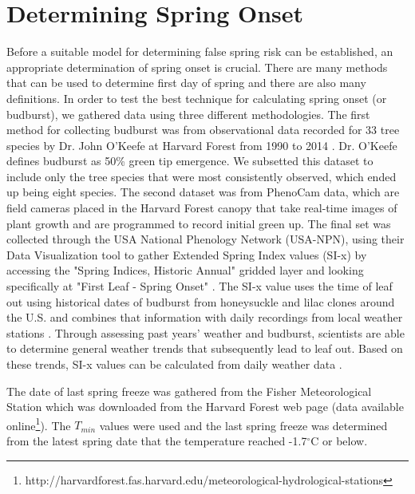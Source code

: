 \documentclass{article}\usepackage[]{graphicx}\usepackage[]{color}
\begin{document}
\section{Determining Spring Onset}
Before a suitable model for determining false spring risk can be established, an appropriate determination of spring onset is crucial. There are many methods that can be used to determine first day of spring and there are also many definitions. In order to test the best technique for calculating spring onset (or budburst), we gathered data using three different methodologies. The first method for collecting budburst was from observational data recorded for 33 tree species by Dr. John O'Keefe at Harvard Forest from 1990 to 2014 \citep{OKeefe2014}. 
Dr. O'Keefe defines budburst as 50\% green tip emergence. We subsetted this dataset to include only the tree species that were most consistently observed, which ended up being eight species.
The second dataset was from PhenoCam data, which are field cameras placed in the Harvard Forest canopy that take real-time images of plant growth and are programmed to record initial green up. The final set was collected through the USA National Phenology Network (USA-NPN), using their Data Visualization tool to gather Extended Spring Index values (SI-x) by accessing the "Spring Indices, Historic Annual" gridded layer and looking specifically at "First Leaf - Spring Onset" \citep{SI-x2016}. The SI-x value uses the time of leaf out using historical dates of budburst from honeysuckle and lilac clones around the U.S. and combines that information with daily recordings from local weather stations \citep{USA-NPN2016, Ault2015, Ault2015a, Schwartz2013, Schwartz1997}. 
Through assessing past years' weather and budburst, scientists are able to determine general weather trends that subsequently lead to leaf out. Based on these trends, SI-x values can be calculated from daily weather data \citep{USA-NPN2016}.
\par
The date of last spring freeze was gathered from the Fisher Meteorological Station which was downloaded from the Harvard Forest web page (data available online\footnote{http://harvardforest.fas.harvard.edu/meteorological-hydrological-stations}). The $T_{min}$ values were used and the last spring freeze was determined from the latest spring date that the temperature reached -1.7$^{\circ}$C or below. 
\par
\end{document}
